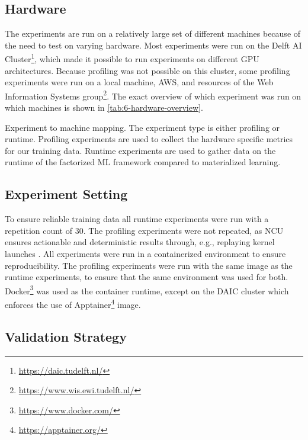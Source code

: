 \subsection{Hardware}
\label{subsec:6-hardware}

The experiments are run on a relatively large set of different machines because of the need to test on varying hardware. Most experiments were run on the Delft AI Cluster\footnote{\url{https://daic.tudelft.nl/}}, which made it possible to run experiments on different GPU architectures. Because profiling was not possible on this cluster, some profiling experiments were run on a local machine, AWS, and resources of the Web Information Systems group\footnote{\url{https://www.wis.ewi.tudelft.nl/}}. The exact overview of which experiment was run on which machines is shown in \autoref{tab:6-hardware-overview}.

\begin{table}[ht]
  \centering
  
  \caption[Experiment to machine mapping]{Experiment to machine mapping. The experiment type is either profiling or runtime. Profiling experiments are used to collect the hardware specific metrics for our training data. Runtime experiments are used to gather data on the runtime of the factorized ML framework compared to materialized learning.}
  \label{tab:6-hardware-overview}
\end{table}

\subsection{Experiment Setting}
To ensure reliable training data all runtime experiments were run with a repetition count of $30$. The profiling experiments were not repeated, as NCU ensures actionable and deterministic results through, e.g., replaying kernel launches \cite{nsight_compute}. All experiments were run in a containerized environment to ensure reproducibility. The profiling experiments were run with the same image as the runtime experiments, to ensure that the same environment was used for both. Docker\footnote{\url{https://www.docker.com/}} was used as the container runtime, except on the DAIC cluster which enforces the use of Apptainer\footnote{\url{https://apptainer.org/}} image.

\subsection{Validation Strategy}
\label{subsec:6-validation-strategy}

